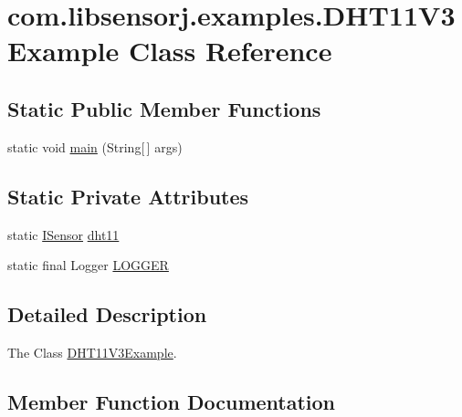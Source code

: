 \hypertarget{classcom_1_1libsensorj_1_1examples_1_1DHT11V3Example}{}\section{com.\+libsensorj.\+examples.\+D\+H\+T11\+V3\+Example Class Reference}
\label{classcom_1_1libsensorj_1_1examples_1_1DHT11V3Example}
\subsection*{Static Public Member Functions}
\begin{DoxyCompactItemize}
\item 
static void \hyperlink{classcom_1_1libsensorj_1_1examples_1_1DHT11V3Example_a4ed6af58ddd7026d7ca95b0195683cfb}{main} (String\mbox{[}$\,$\mbox{]} args)
\end{DoxyCompactItemize}
\subsection*{Static Private Attributes}
\begin{DoxyCompactItemize}
\item 
static \hyperlink{interfacecom_1_1libsensorj_1_1interfaces_1_1ISensor}{I\+Sensor} \hyperlink{classcom_1_1libsensorj_1_1examples_1_1DHT11V3Example_abb6525b581e1d2e3cdc9d5904f0bd69d}{dht11}
\item 
static final Logger \hyperlink{classcom_1_1libsensorj_1_1examples_1_1DHT11V3Example_a8bce3e00742905abcf18e77164a69279}{L\+O\+G\+G\+E\+R}
\end{DoxyCompactItemize}


\subsection{Detailed Description}
The Class \hyperlink{classcom_1_1libsensorj_1_1examples_1_1DHT11V3Example}{D\+H\+T11\+V3\+Example}. 

\subsection{Member Function Documentation}
\hypertarget{classcom_1_1libsensorj_1_1examples_1_1DHT11V3Example_a4ed6af58ddd7026d7ca95b0195683cfb}{}
